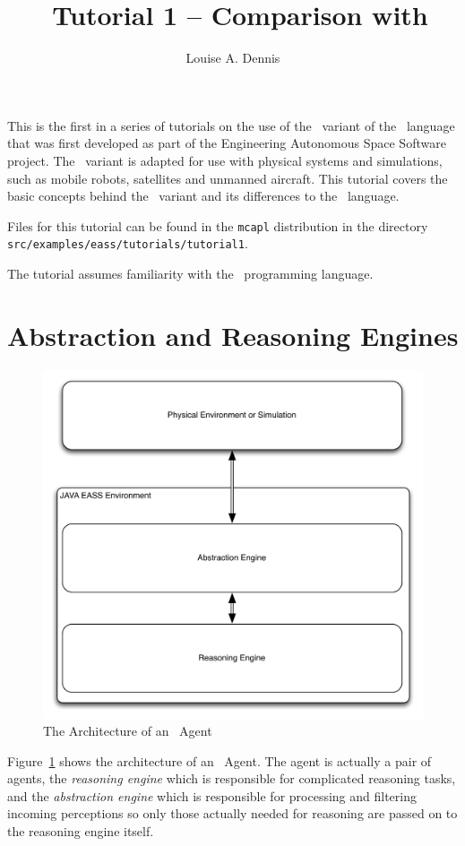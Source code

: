 \documentclass[a4]{article}
\author{Louise A. Dennis}
\title{\eass\ Tutorial 1 -- Comparison with \gwendolen}
\begin{document}
\maketitle
This is the first in a series of tutorials on the use of the \eass\ variant of the \gwendolen\ language that was first developed as part of the Engineering Autonomous Space Software project.  The \eass\ variant is adapted for use with physical systems and simulations, such as mobile robots, satellites and unmanned aircraft.  This tutorial covers the basic concepts behind the \eass\ variant and its differences to the \gwendolen\ language.  

Files for this tutorial can be found in the \texttt{mcapl} distribution in the directory \texttt{src/examples/eass/tutorials/tutorial1}.

The tutorial assumes familiarity with the \gwendolen\ programming language.

\section{Abstraction and Reasoning Engines}

\begin{figure}[htb]
\includegraphics[width=\textwidth]{arch.pdf}
\caption{The Architecture of an \eass\ Agent}
\label{fig:arch}
\end{figure}
Figure~\ref{fig:arch} shows the architecture of an \eass\ Agent.  The agent is actually a pair of agents, the \emph{reasoning engine} which is responsible for complicated reasoning tasks, and the \emph{abstraction engine} which is responsible for processing and filtering incoming perceptions so only those actually needed for reasoning are passed on to the reasoning engine itself.
\end{document}
